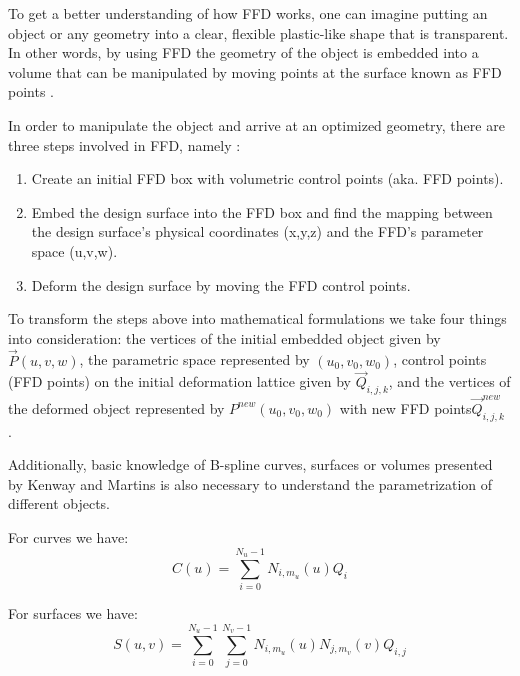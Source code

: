 \documentclass[12pt]{article}
\begin{document}
\noindent To get a better understanding of how FFD works, one can imagine putting an object or any geometry into a clear, flexible plastic-like shape that is transparent. In other words, by using FFD the geometry of the object is embedded into a volume that can be manipulated by moving points at the surface known as FFD points \cite{He2018}. \vspace{4mm} 


\noindent In order to manipulate the object and arrive at an optimized geometry, there are three steps involved in FFD, namely : 

\begin{enumerate}
    \item Create an initial FFD box with volumetric control points (aka. FFD points).
    \item Embed the design surface into the FFD box and find the mapping between the design surface's physical coordinates (x,y,z) and the FFD's parameter space (u,v,w).
    \item Deform the design surface by moving the FFD control points.
\end{enumerate}

\noindent To transform the steps above into mathematical formulations we take four things into consideration: the vertices of the initial embedded object given by $\overrightarrow{P}(u,v,w)$, the parametric space represented by $(u_0,v_0,w_0)$, control points (FFD points) on the initial deformation lattice given by $\overrightarrow{Q}_{i,j,k}$, and the vertices of the deformed object represented by $P^{new}(u_0,v_0,w_0)$ with new FFD points$\overrightarrow{Q}_{i,j,k}^{new}$ .\vspace{4mm} 

\noindent Additionally, basic knowledge of B-spline curves, surfaces or volumes presented by Kenway and Martins \cite{kenway} is also necessary to understand the parametrization of different objects.\vspace{4mm} 

For curves we have:
\begin{equation}
    C(u)=\sum_{i=0}^{N_{u}-1}N_{i,m_u}(u)Q_i
\end{equation}

For surfaces we have:\vspace{4mm} 
\begin{equation}
    S(u,v)= \sum^{N_{u}-1}_{i=0}\sum^{N_{v}-1}_{j=0}N_{i,m_u}(u)N_{j,m_v}(v)Q_{i,j}
\end{equation}
\end{document}
